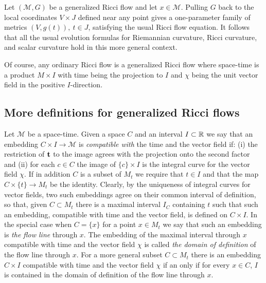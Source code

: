 \begin{remark}\label{rem:generalized-ricci-flow-local}


Let $({\mathcal M},G)$ be a generalized Ricci flow and let $x\in
{\mathcal M}$. Pulling $G$ back to  the local coordinates $V\times
J$ defined near any point gives a one-parameter family of metrics
$(V,g(t)),\  t\in J$, satisfying the usual Ricci flow equation. It
follows that all the usual evolution formulas for Riemannian
curvature, Ricci curvature, and scalar curvature hold in this more
general context.
\end{remark}

Of course, any ordinary Ricci flow is a generalized Ricci flow where
space-time is a product $M\times I$ with time being the projection
to $I$ and $\chi$ being the unit vector field in the positive
$I$-direction.


\subsection{More definitions for generalized Ricci flows}

\begin{definition}\label{def:compatible-embedding}


Let ${\mathcal M}$ be a space-time. Given a space $C$ and an
interval $I\subset \mathbb{R}$  we say that an embedding $C\times I\to
{\mathcal M}$ is {\em compatible with} the time and the vector field
if: (i) the restriction of ${\bf t}$ to the image agrees with the
projection onto the second factor and (ii) for each $c\in C$ the
image of $\{c\}\times I$ is the integral curve for the vector field
$\chi$.
 If in addition $C$ is a subset of $M_{t}$
we require that $t\in I$ and that the map $C\times\{t\}\to M_{t}$ be
the identity. Clearly, by the uniqueness of integral curves for vector fields,
 two such embeddings agree on their common interval of definition, so that,
given $C\subset M_{t}$ there is a maximal interval $I_C$ containing
$t$ such that such an embedding, compatible with time and the vector field,
 is defined on $C\times I$. In the
special case when $C=\{x\}$ for a point $x\in M_{t}$ we say that
such an embedding is {\em the flow line} through $x$. The embedding
of the maximal interval through $x$ compatible with time and the vector
field $\chi$ is called {\em the domain of definition} of the flow
line through $x$. For a more general subset $C\subset M_{t}$ there
is an embedding $C\times I$ compatible with time and the vector
field $\chi$ if an only if for every $x\in C$, $I$ is contained in
the domain of definition of the flow line through $x$.
\end{definition}


